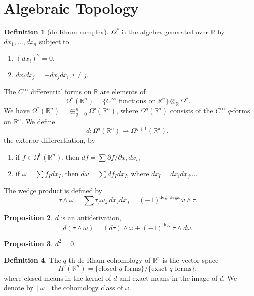 \documentclass[twocolumn]{article}
\theoremstyle{definition}
\newtheorem{definition}{Definition}[section]
\newtheorem{proposition}[definition]{Proposition}
\begin{document}
\section{Algebraic Topology}
\begin{definition}[de Rham complex]
    $\Omega^*$ is the algebra generated over $\mathbb{R}$ by $dx_1, \dots, dx_n$ subject to
    \begin{enumerate}[noitemsep]
        \item $(dx_i)^2 = 0$,
        \item $dx_i dx_j = -dx_j dx_i, i \neq j$.
    \end{enumerate}
    The $C^\infty$ differential forms on $\mathbb{R}$ are elements of
    \begin{equation}
        \Omega^*(\mathbb{R}^n) = \{ C^\infty \textrm{ functions on } \mathbb{R}^n \} \otimes_\mathbb{R} \Omega^*.
    \end{equation}
    We have $\Omega^*(\mathbb{R}^n) = \oplus^n_{q=0} \Omega^q(\mathbb{R}^n)$,
    where $\Omega^q(\mathbb{R}^n)$ consists of the $C^\infty$ $q$-forms on $\mathbb{R}^n$. We define
    \begin{equation}
        d : \Omega^q(\mathbb{R}^n) \rightarrow \Omega^{q+1}(\mathbb{R}^n),
    \end{equation}
    the exterior differentiation, by
    \begin{enumerate}[noitemsep]
        \item if $f \in \Omega^0(\mathbb{R}^n)$, then $df = \sum \partial f / \partial x_i \, dx_i$,
        \item if $\omega = \sum f_I dx_I$, then $d\omega = \sum df_I dx_I$, where $dx_I = dx_i dx_j \dots $.
    \end{enumerate}
    The wedge product is defined by
    \begin{equation}
        \tau \wedge \omega = \sum \tau_I \omega_J \, dx_I dx_J = (-1)^{\mathrm{deg }\tau\,\mathrm{deg }\omega} \omega \wedge \tau.
    \end{equation}
\end{definition}
\begin{proposition}
    $d$ is an antiderivation,
    \begin{equation}
        d(\tau \wedge \omega) = (d\tau) \wedge \omega + (-1)^{\mathrm{deg} \tau} \tau \wedge d\omega.
    \end{equation}
\end{proposition}
\begin{proposition}
    $d^2 = 0$.
\end{proposition}
\begin{definition}
    The $q$-th de Rham cohomology of $\mathbb{R}^n$ is the vector space
    \begin{equation}
        H^q(\mathbb{R}^n) = \{\textrm{closed $q$-forms}\}/\{\textrm{exact $q$-forms}\},
    \end{equation}
    where closed means in the kernel of $d$ and exact means in the image of $d$.
    We denote by $[\omega]$ the cohomology class of $\omega$.
\end{definition}
\end{document}
